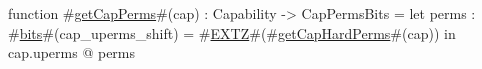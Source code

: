function #\hyperref[sailRISCVzgetCapPerms]{getCapPerms}#(cap) : Capability -> CapPermsBits =
    let perms : #\hyperref[sailRISCVzbits]{bits}#(cap_uperms_shift) = #\hyperref[sailRISCVzEXTZ]{EXTZ}#(#\hyperref[sailRISCVzgetCapHardPerms]{getCapHardPerms}#(cap)) in
    cap.uperms @ perms
